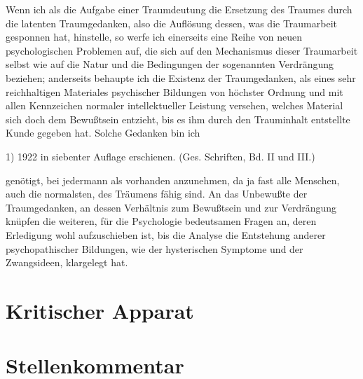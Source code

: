 \documentclass{article}
\begin{document}
            
        \pstart
        Wenn ich als die Aufgabe einer Traumdeutung die Ersetzung des Traumes durch die
               latenten Traumgedanken, also die Auflösung dessen, was die
               Traumarbeit gesponnen hat, hinstelle, so werfe ich einerseits eine Reihe von
               neuen psychologischen Problemen auf, die sich auf den Mechanismus
               dieser Traumarbeit selbst wie auf die Natur und die Bedingungen der
               sogenannten Verdrängung beziehen; anderseits behaupte ich die Existenz der
               Traumgedanken, als eines sehr reichhaltigen Materiales psychischer Bildungen von
               höchster Ordnung und mit allen Kennzeichen normaler intellektueller Leistung
               versehen, welches Material sich doch dem Bewußtsein entzieht, bis es ihm durch
               den Trauminhalt entstellte Kunde gegeben hat. Solche Gedanken bin
               ich
        \pend
    
            1) 1922 in siebenter Auflage
               erschienen. (Ges. Schriften, Bd. II und III.)
         
            
            
            
        \pstart
        genötigt, bei jedermann als vorhanden anzunehmen, da ja fast alle
               Menschen, auch die normalsten, des Träumens fähig sind. An das Unbewußte der
               Traumgedanken, an dessen Verhältnis zum Bewußtsein und zur Verdrängung knüpfen
               die weiteren, für die Psychologie bedeutsamen Fragen an, deren Erledigung
               wohl aufzuschieben ist, bis die Analyse die Entstehung anderer psychopathischer Bildungen, wie der hysterischen Symptome und der
               Zwangsideen, klargelegt hat.
        \pend
    
         
        \endnumbering
  
        \section*{Kritischer Apparat}
        
        \section*{Stellenkommentar}
        
        \printindex[person]
        \printindex[kw]
        


        
\end{document}
